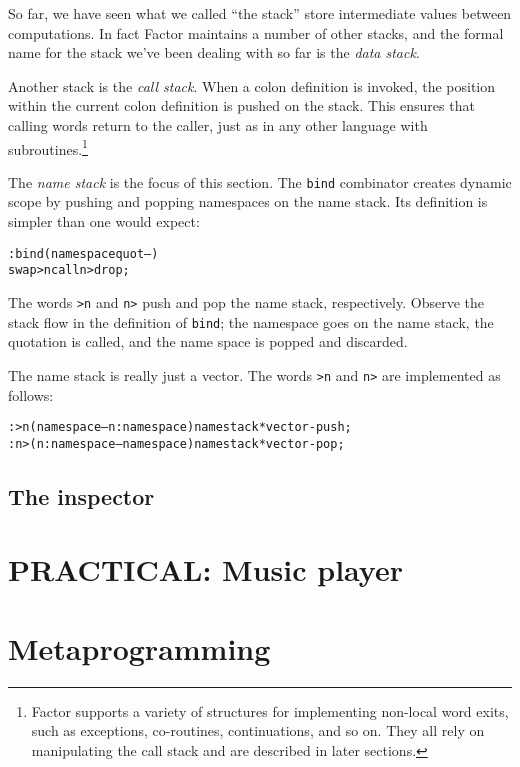 \documentclass[english]{article}
\begin{document}
So far, we have seen what we called ``the stack'' store intermediate values between computations. In fact Factor maintains a number of other stacks, and the formal name for the stack we've been dealing with so far is the \emph{data stack}.

Another stack is the \emph{call stack}. When a colon definition is invoked, the position within the current colon definition is pushed on the stack. This ensures that calling words return to the caller, just as in any other language with subroutines.\footnote{Factor supports a variety of structures for implementing non-local word exits, such as exceptions, co-routines, continuations, and so on. They all rely on manipulating the call stack and are described in later sections.}

The \emph{name stack} is the focus of this section. The \texttt{bind} combinator creates dynamic scope by pushing and popping namespaces on the name stack. Its definition is simpler than one would expect:

\begin{alltt}
: bind ( namespace quot -- )
    swap >n call n> drop ;
\end{alltt}

The words \texttt{>n} and \texttt{n>} push and pop the name stack, respectively. Observe the stack flow in the definition of \texttt{bind}; the namespace goes on the name stack, the quotation is called, and the name space is popped and discarded.

The name stack is really just a vector. The words \texttt{>n} and \texttt{n>} are implemented as follows:

\begin{alltt}
: >n ( namespace -- n:namespace ) namestack* vector-push ;
: n> ( n:namespace -- namespace ) namestack* vector-pop ;
\end{alltt}

\subsection{The inspector}


\section{PRACTICAL: Music player}


\section{Metaprogramming}
\end{document}
